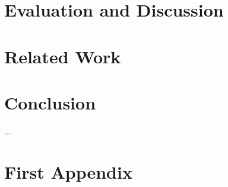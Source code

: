 \documentclass{llncs}
\begin{document}

\section{Evaluation and Discussion}




\section{Related Work\label{related}}



\section{Conclusion}


%
...
%


\nocite{*}


%




%
\appendix
\section{First Appendix}
\end{document}
